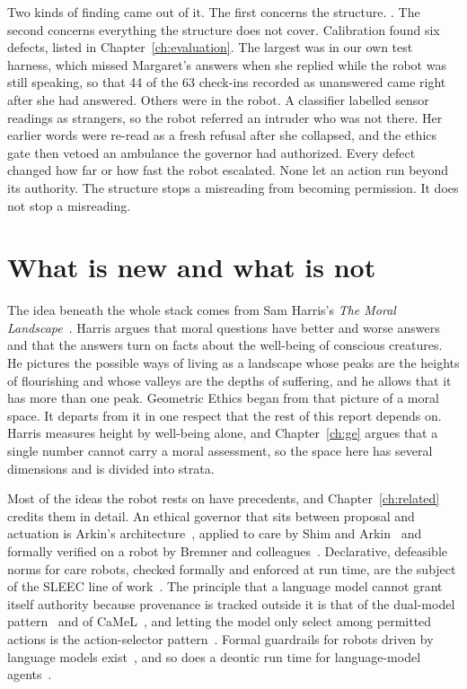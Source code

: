 Two kinds of finding came out of it. The first concerns the structure. . The second concerns everything
the structure does not cover. Calibration found six defects, listed in Chapter~\ref{ch:evaluation}.
The largest was in our own test harness, which missed Margaret's answers when she replied while
the robot was still speaking, so that 44 of the 63 check-ins recorded as unanswered came right
after she had answered. Others were in the robot. A classifier labelled sensor readings as
strangers, so the robot referred an intruder who was not there. Her earlier words were re-read as
a fresh refusal after she collapsed, and the ethics gate then vetoed an ambulance the governor had
authorized. Every defect changed how far or how fast the robot escalated. None let an action run
beyond its authority. The structure stops a misreading from becoming permission. It does not stop
a misreading.

\section{What is new and what is not}

The idea beneath the whole stack comes from Sam Harris's \emph{The Moral
Landscape}~\cite{harris2010moral}. Harris argues that moral questions have better and worse answers
and that the answers turn on facts about the well-being of conscious creatures. He pictures the
possible ways of living as a landscape whose peaks are the heights of flourishing and whose valleys
are the depths of suffering, and he allows that it has more than one peak. Geometric Ethics began
from that picture of a moral space. It departs from it in one respect that the rest of this report
depends on. Harris measures height by well-being alone, and Chapter~\ref{ch:ge} argues that a single
number cannot carry a moral assessment, so the space here has several dimensions and is divided
into strata.

Most of the ideas the robot rests on have precedents, and Chapter~\ref{ch:related} credits them in
detail. An ethical governor that sits between proposal and actuation is Arkin's
architecture~\cite{arkin2009governing}, applied to care by Shim and Arkin~\cite{shim2017intervening}
and formally verified on a robot by Bremner and colleagues~\cite{bremner2019proactive}.
Declarative, defeasible norms for care robots, checked formally and enforced at run time, are the
subject of the SLEEC line of work~\cite{getiryaman2023sleec,desanctis2026sleecruntime}. The
principle that a language model cannot grant itself authority because provenance is tracked
outside it is that of the dual-model pattern~\cite{willison2023dualllm} and of
CaMeL~\cite{debenedetti2026camel}, and letting the model only select among permitted actions is the
action-selector pattern~\cite{beurerkellner2025patterns}. Formal guardrails for robots driven by
language models exist~\cite{yang2024safetychip,ravichandran2026roboguard}, and so does a deontic
run time for language-model agents~\cite{joshi2026deontic}.

